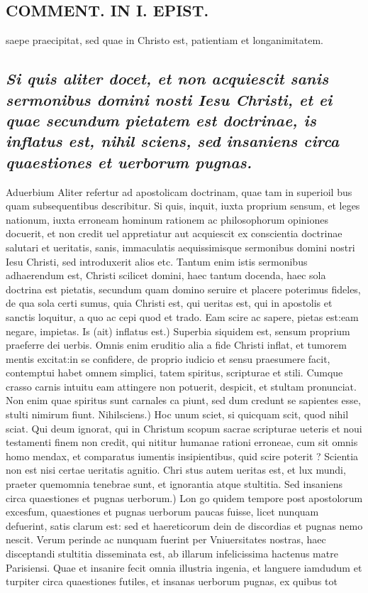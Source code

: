 \documentclass{article}
\begin{document}
\begin{pages}
\section*{COMMENT. IN I. EPIST. }
\marginpar{[ p.530 ]}\pstart saepe praecipitat, sed quae in Christo est, patientiam et longanimitatem.  \pend
{}
{}
\subsection*{\textit{Si quis aliter docet, et non acquiescit sanis sermonibus domini nosti Iesu Christi, et ei quae secundum pietatem est doctrinae, is inflatus est, nihil sciens, sed insaniens circa quaestiones et uerborum pugnas. }}\pstart Aduerbium Aliter refertur ad apostolicam doctrinam, quae tam in superioil bus quam subsequentibus describitur. Si quis, inquit, iuxta proprium sensum, et leges nationum, iuxta erroneam hominum rationem ac philosophorum opiniones docuerit, et non credit uel appretiatur aut acquiescit ex conscientia doctrinae salutari et ueritatis, sanis, immaculatis aequissimisque sermonibus domini nostri Iesu Christi, sed introduxerit alios etc. Tantum enim istis sermonibus adhaerendum est, Christi scilicet domini, haec tantum docenda, haec sola doctrina est pietatis, secundum quam domino seruire et placere poterimus fideles, de qua sola certi sumus, quia Christi est, qui ueritas est, qui in apostolis et sanctis loquitur, a quo ac cepi quod et trado. Eam scire ac sapere, pietas est:eam negare, impietas. Is (ait) inflatus est.) Superbia siquidem est, sensum proprium praeferre dei uerbis. Omnis enim eruditio alia a fide Christi inflat, et tumorem mentis excitat:in se confidere, de proprio iudicio et sensu praesumere facit, contemptui habet omnem simplici, tatem spiritus, scripturae et stili. Cumque crasso carnis intuitu eam attingere non potuerit, despicit, et stultam pronunciat. Non enim quae spiritus sunt carnales ca piunt, sed dum credunt se sapientes esse, stulti nimirum fiunt. Nihilsciens.) Hoc unum sciet, si quicquam scit, quod nihil sciat. Qui deum ignorat, qui in Christum scopum sacrae scripturae ueteris et noui testamenti finem non credit, qui nititur humanae rationi erroneae, cum sit omnis homo mendax, et comparatus iumentis insipientibus, quid scire poterit ? Scientia non est nisi certae ueritatis agnitio. Chri stus autem ueritas est, et lux mundi, praeter quemomnia tenebrae sunt, et ignorantia atque stultitia. Sed insaniens circa quaestiones et pugnas uerborum.) Lon go quidem tempore post apostolorum excesfum, quaestiones et pugnas uerborum paucas fuisse, licet nunquam defuerint, satis clarum est: sed et haereticorum dein de discordias et pugnas nemo nescit. Verum perinde ac nunquam fuerint per Vniuersitates nostras, haec disceptandi stultitia disseminata est, ab illarum infelicissima hactenus matre Parisiensi. Quae et insanire fecit omnia illustria ingenia, et languere iamdudum et turpiter circa quaestiones futiles, et insanas uerborum pugnas, ex quibus tot 
\end{pages}
\end{document}
